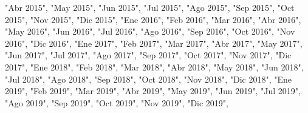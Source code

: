\documentclass[
]{book}
\newenvironment{Shaded}{\begin{snugshade}}{\end{snugshade}}
\newcommand{\NormalTok}[1]{#1}
\newcommand{\StringTok}[1]{\textcolor[rgb]{0.31,0.60,0.02}{#1}}
\begin{document}
\begin{Shaded}
\begin{Highlighting}[]
                                   \StringTok{"Abr 2015"}\NormalTok{, }\StringTok{"May 2015"}\NormalTok{, }\StringTok{"Jun 2015"}\NormalTok{,}
                                   \StringTok{"Jul 2015"}\NormalTok{, }\StringTok{"Ago 2015"}\NormalTok{, }\StringTok{"Sep 2015"}\NormalTok{, }
                                   \StringTok{"Oct 2015"}\NormalTok{, }\StringTok{"Nov 2015"}\NormalTok{, }\StringTok{"Dic 2015"}\NormalTok{,}
                                   \StringTok{"Ene 2016"}\NormalTok{, }\StringTok{"Feb 2016"}\NormalTok{, }\StringTok{"Mar 2016"}\NormalTok{, }
                                   \StringTok{"Abr 2016"}\NormalTok{, }\StringTok{"May 2016"}\NormalTok{, }\StringTok{"Jun 2016"}\NormalTok{,}
                                   \StringTok{"Jul 2016"}\NormalTok{, }\StringTok{"Ago 2016"}\NormalTok{, }\StringTok{"Sep 2016"}\NormalTok{, }
                                   \StringTok{"Oct 2016"}\NormalTok{, }\StringTok{"Nov 2016"}\NormalTok{, }\StringTok{"Dic 2016"}\NormalTok{,}
                                   \StringTok{"Ene 2017"}\NormalTok{, }\StringTok{"Feb 2017"}\NormalTok{, }\StringTok{"Mar 2017"}\NormalTok{, }
                                   \StringTok{"Abr 2017"}\NormalTok{, }\StringTok{"May 2017"}\NormalTok{, }\StringTok{"Jun 2017"}\NormalTok{,}
                                   \StringTok{"Jul 2017"}\NormalTok{, }\StringTok{"Ago 2017"}\NormalTok{, }\StringTok{"Sep 2017"}\NormalTok{, }
                                   \StringTok{"Oct 2017"}\NormalTok{, }\StringTok{"Nov 2017"}\NormalTok{, }\StringTok{"Dic 2017"}\NormalTok{,}
                                   \StringTok{"Ene 2018"}\NormalTok{, }\StringTok{"Feb 2018"}\NormalTok{, }\StringTok{"Mar 2018"}\NormalTok{, }
                                   \StringTok{"Abr 2018"}\NormalTok{, }\StringTok{"May 2018"}\NormalTok{, }\StringTok{"Jun 2018"}\NormalTok{,}
                                   \StringTok{"Jul 2018"}\NormalTok{, }\StringTok{"Ago 2018"}\NormalTok{, }\StringTok{"Sep 2018"}\NormalTok{, }
                                   \StringTok{"Oct 2018"}\NormalTok{, }\StringTok{"Nov 2018"}\NormalTok{, }\StringTok{"Dic 2018"}\NormalTok{,}
                                   \StringTok{"Ene 2019"}\NormalTok{, }\StringTok{"Feb 2019"}\NormalTok{, }\StringTok{"Mar 2019"}\NormalTok{, }
                                   \StringTok{"Abr 2019"}\NormalTok{, }\StringTok{"May 2019"}\NormalTok{, }\StringTok{"Jun 2019"}\NormalTok{,}
                                   \StringTok{"Jul 2019"}\NormalTok{, }\StringTok{"Ago 2019"}\NormalTok{, }\StringTok{"Sep 2019"}\NormalTok{, }
                                   \StringTok{"Oct 2019"}\NormalTok{, }\StringTok{"Nov 2019"}\NormalTok{, }\StringTok{"Dic 2019"}\NormalTok{,}

\end{Highlighting}
\end{Shaded}
\end{document}
